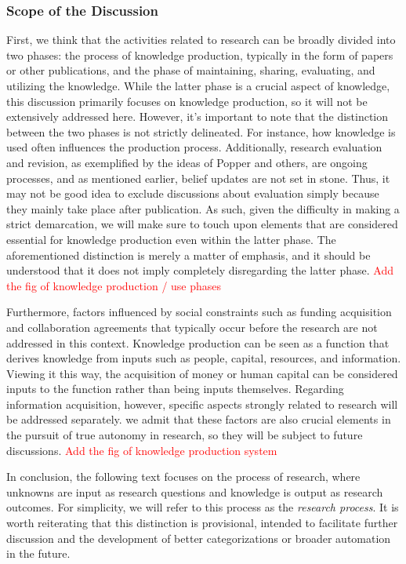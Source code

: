 \documentclass{book}
\begin{document}
\subsubsection{Scope of the Discussion}
First, we think that the activities related to research can be broadly divided into two phases: the process of knowledge production, typically in the form of papers or other publications, and the phase of maintaining, sharing, evaluating, and utilizing the knowledge. While the latter phase is a crucial aspect of knowledge, this discussion primarily focuses on knowledge production, so it will not be extensively addressed here. However, it's important to note that the distinction between the two phases is not strictly delineated. For instance, how knowledge is used often influences the production process. Additionally, research evaluation and revision, as exemplified by the ideas of Popper and others, are ongoing processes, and as mentioned earlier, belief updates are not set in stone. Thus, it may not be good idea to exclude discussions about evaluation simply because they mainly take place after publication. As such, given the difficulty in making a strict demarcation, we will make sure to touch upon elements that are considered essential for knowledge production even within the latter phase. The aforementioned distinction is merely a matter of emphasis, and it should be understood that it does not imply completely disregarding the latter phase. \textcolor{red}{Add the fig of knowledge production / use phases}

Furthermore, factors influenced by social constraints such as funding acquisition and collaboration agreements that typically occur before the research are not addressed in this context. Knowledge production can be seen as a function that derives knowledge from inputs such as people, capital, resources, and information. Viewing it this way, the acquisition of money or human capital can be considered inputs to the function rather than being inputs themselves. Regarding information acquisition, however, specific aspects strongly related to research will be addressed separately. we admit that these factors are also crucial elements in the pursuit of true autonomy in research, so they will be subject to future discussions. \textcolor{red}{Add the fig of knowledge production system}

In conclusion, the following text focuses on the process of research, where unknowns are input as research questions and knowledge is output as research outcomes. For simplicity, we will refer to this process as the \textit{research process}. It is worth reiterating that this distinction is provisional, intended to facilitate further discussion and the development of better categorizations or broader automation in the future.
\end{document}
